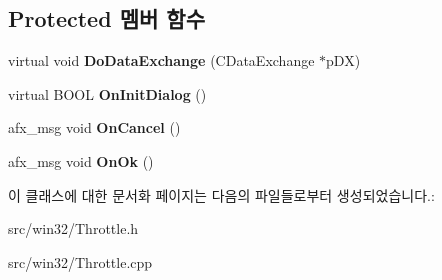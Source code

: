 \subsection*{Protected 멤버 함수}
\begin{DoxyCompactItemize}
\item 
\mbox{\label{class_throttle_a634843a66c6f1f27b70d8313a88765a5}} 
virtual void {\bfseries Do\+Data\+Exchange} (C\+Data\+Exchange $\ast$p\+DX)
\item 
\mbox{\label{class_throttle_ac091cd673324246105b4c3d76e25e894}} 
virtual B\+O\+OL {\bfseries On\+Init\+Dialog} ()
\item 
\mbox{\label{class_throttle_a958ff983d0c33bebd3a4035695774eed}} 
afx\+\_\+msg void {\bfseries On\+Cancel} ()
\item 
\mbox{\label{class_throttle_ae8947386977fc3c1e47bea6f3ddb07b8}} 
afx\+\_\+msg void {\bfseries On\+Ok} ()
\end{DoxyCompactItemize}


이 클래스에 대한 문서화 페이지는 다음의 파일들로부터 생성되었습니다.\+:\begin{DoxyCompactItemize}
\item 
src/win32/Throttle.\+h\item 
src/win32/Throttle.\+cpp\end{DoxyCompactItemize}
